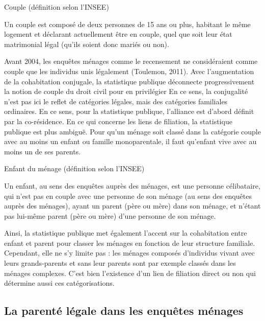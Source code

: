 \documentclass[
  12pt,
]{book}
\begin{document}
\begin{encadre}{Couple (définition selon l'INSEE)}

Un couple est composé de deux personnes de 15 ans ou plus, habitant le même logement et déclarant actuellement être en couple, quel que soit leur état matrimonial légal (qu'ils soient donc mariés ou non).

\end{encadre}

Avant 2004, les enquêtes ménages comme le recensement ne considéraient
comme couple que les individus unis légalement (Toulemon, 2011). Avec
l'augmentation de la cohabitation conjugale, la statistique publique
déconnecte progressivement la notion de couple du droit civil pour en
privilégier En ce sens, la conjugalité n'est pas ici le reflet de
catégories légales, mais des catégories familiales ordinaires. En ce
sens, pour la statistique publique, l'alliance est d'abord définit par
la co-résidence. En ce qui concerne les liens de filiation, la
statistique publique est plus ambiguë. Pour qu'un ménage soit classé
dans la catégorie couple avec au moins un enfant ou famille
monoparentale, il faut qu'enfant vive avec au moins un de ses parents.

\begin{encadre}{Enfant du ménage (définition selon l'INSEE)}

Un enfant, au sens des enquêtes auprès des ménages, est une personne
célibataire, qui n'est pas en couple avec une personne de son ménage (au sens des enquêtes auprès des ménages), ayant un parent (père ou mère) dans son ménage, et n'étant pas lui-même parent (père ou mère) d'une personne de son ménage.

\end{encadre}

Ainsi, la statistique publique met également l'accent sur la
cohabitation entre enfant et parent pour classer les ménages en fonction
de leur structure familiale. Cependant, elle ne s'y limite pas : les
ménages composés d'individus vivant avec leurs grands-parents et sans
leur parents sont par exemple classés dans les ménages complexes. C'est
bien l'existence d'un lien de filiation direct ou non qui détermine
aussi ces catégorisations.

\subsection{La parenté légale dans les enquêtes
ménages}\label{la-parentuxe9-luxe9gale-dans-les-enquuxeates-muxe9nages}
\end{document}

